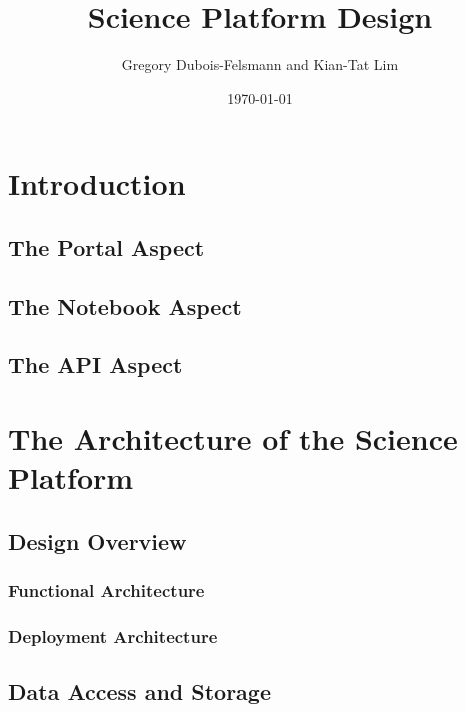 \documentclass[DM,lsstdraft,toc]{lsstdoc}
\title{Science Platform Design}
\author{%
Gregory Dubois-Felsmann
and
Kian-Tat Lim
}
\date{\today}
\begin{document}
\maketitle

\section{Introduction}\label{introduction}

\subsection{The Portal Aspect}\label{portal-aspect-intro}

\subsection{The Notebook Aspect}\label{notebook-aspect-intro}

\subsection{The API Aspect}\label{api-aspect-intro}

\section{The Architecture of the Science Platform}\label{architecture}

\subsection{Design Overview}\label{design-overview}

\subsubsection{Functional Architecture}\label{functional-architecture}

\subsubsection{Deployment Architecture}\label{deployment-architecture}

\subsection{Data Access and Storage}\label{data-access-and-storage}
\end{document}
